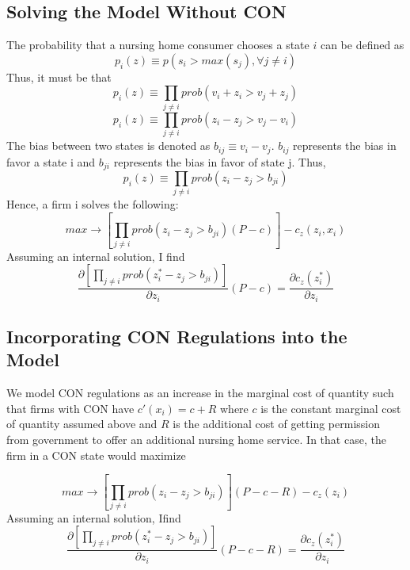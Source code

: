 \documentclass[../Main.tex]{subfiles}
\begin{document}
\subsection{Solving the Model Without CON}
The probability that a nursing home consumer chooses a state $i$ can be defined as \begin{equation}p_i(z) \equiv p(s_i> max(s_j), \forall j \neq i )\end{equation}
Thus, it must be that \begin{equation}p_i(z) \equiv \prod_{j\neq i} prob(v_i + z_i > v_j + z_j) \end{equation} 
 \begin{equation}p_i(z) \equiv \prod_{j\neq i} prob(z_i-z_j > v_j - v_i) \end{equation} 
The bias between two states is denoted as $b_{ij} \equiv v_i -v_j $. $b_{ij}$ represents the bias in favor a state i and $b_{ji}$ represents the bias in favor of state j. Thus,\begin{equation}p_i(z) \equiv \prod_{j\neq i} prob(z_i -z_j > b_{ji}) \end{equation}  
Hence, a firm i solves the following:\begin{equation}max \rightarrow [\prod_{j\neq i} prob(z_i -z_j > b_{ji})(P-c)] - c_z(z_i,x_i)\end{equation}
Assuming an internal solution, I find 
 \begin{equation}\frac{\partial [\prod_{j\neq i} prob(z_i^* -z_j > b_{ji})]}{\partial z_i}(P-c) = \frac{\partial c_z(z_i^*)}{\partial z_i}\end{equation}

\subsection{Incorporating CON Regulations into the Model}

We model CON regulations as an increase in the marginal cost of quantity such that firms with CON have $c'(x_i) = c + R$ where $c$ is the constant marginal cost of quantity assumed above and $R$ is the additional cost of getting permission from government to offer an additional nursing home service. In that case, the firm in a CON state would maximize

\begin{equation} max \rightarrow [\prod_{j\neq i} prob(z_i -z_j > b_{ji})](P-c - R) - c_z(z_i) \end{equation}
Assuming an internal solution, Ifind 
 \begin{equation}\frac{\partial [\prod_{j\neq i} prob(z_i^* -z_j > b_{ji})]}{\partial z_i}(P-c-R) = \frac{\partial c_z(z_i^*)}{\partial z_i}\end{equation}
\end{document}
